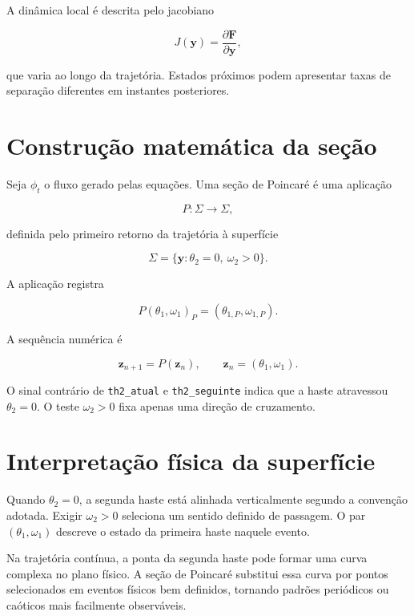 \documentclass[12pt,a4paper]{article}
\begin{document}
A dinâmica local é descrita pelo jacobiano

\begin{equation}
J(\mathbf y)=\frac{\partial\mathbf F}{\partial\mathbf y},
\end{equation}

que varia ao longo da trajetória. Estados próximos podem apresentar taxas de separação diferentes em instantes posteriores.

\section{Construção matemática da seção}

Seja $\phi_t$ o fluxo gerado pelas equações. Uma seção de Poincaré é uma aplicação

\begin{equation}
P:\Sigma\rightarrow\Sigma,
\end{equation}

definida pelo primeiro retorno da trajetória à superfície

\begin{equation}
\Sigma=\{\mathbf y:\theta_2=0,\ \omega_2>0\}.
\end{equation}

A aplicação registra

\begin{equation}
P(\theta_1,\omega_1)_P=(\theta_{1,P},\omega_{1,P}).
\end{equation}

A sequência numérica é

\begin{equation}
\mathbf z_{n+1}=P(\mathbf z_n),
\qquad
\mathbf z_n=(\theta_1,\omega_1).
\end{equation}

O sinal contrário de \texttt{th2_atual} e \texttt{th2_seguinte} indica que a haste atravessou $\theta_2=0$. O teste $\omega_2>0$ fixa apenas uma direção de cruzamento.

\section{Interpretação física da superfície}

Quando $\theta_2=0$, a segunda haste está alinhada verticalmente segundo a convenção adotada. Exigir $\omega_2>0$ seleciona um sentido definido de passagem. O par $(\theta_1,\omega_1)$ descreve o estado da primeira haste naquele evento.

Na trajetória contínua, a ponta da segunda haste pode formar uma curva complexa no plano físico. A seção de Poincaré substitui essa curva por pontos selecionados em eventos físicos bem definidos, tornando padrões periódicos ou caóticos mais facilmente observáveis.
\end{document}
